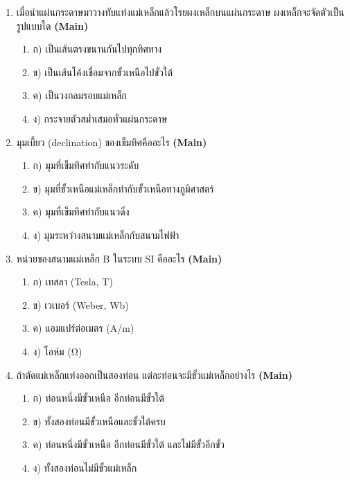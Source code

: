 \documentclass[12pt]{article}
\begin{document}
\begin{enumerate}[label=\arabic*.]
\begin{enumerate}[label=)]
\item ก) ความต้านทานของขดลวด
\item ข) จำนวนรอบของขดลวดและกระแสไฟฟ้า
\item ค) แรงดันไฟฟ้าของแหล่งจ่าย
\item ง) ความยาวของขดลวดเท่านั้น
\end{enumerate}
\item เมื่อนำแผ่นกระดาษมาวางทับแท่งแม่เหล็กแล้วโรยผงเหล็กบนแผ่นกระดาษ ผงเหล็กจะจัดตัวเป็นรูปแบบใด \hfill \textbf{\small (Main)}
\begin{enumerate}[label=)]
\item ก) เป็นเส้นตรงขนานกันไปทุกทิศทาง
\item ข) เป็นเส้นโค้งเชื่อมจากขั้วเหนือไปขั้วใต้
\item ค) เป็นวงกลมรอบแม่เหล็ก
\item ง) กระจายตัวสม่ำเสมอทั่วแผ่นกระดาษ
\end{enumerate}
\item มุมเบี้ยว (declination) ของเข็มทิศคืออะไร \hfill \textbf{\small (Main)}
\begin{enumerate}[label=)]
\item ก) มุมที่เข็มทิศทำกับแนวระดับ
\item ข) มุมที่ขั้วเหนือแม่เหล็กทำกับขั้วเหนือทางภูมิศาสตร์
\item ค) มุมที่เข็มทิศทำกับแนวดิ่ง
\item ง) มุมระหว่างสนามแม่เหล็กกับสนามไฟฟ้า
\end{enumerate}
\item หน่วยของสนามแม่เหล็ก B ในระบบ SI คืออะไร \hfill \textbf{\small (Main)}
\begin{enumerate}[label=)]
\item ก) เทสลา (Tesla, T)
\item ข) เวเบอร์ (Weber, Wb)
\item ค) แอมแปร์ต่อเมตร (A/m)
\item ง) โอห์ม (Ω)
\end{enumerate}
\item ถ้าตัดแม่เหล็กแท่งออกเป็นสองท่อน แต่ละท่อนจะมีขั้วแม่เหล็กอย่างไร \hfill \textbf{\small (Main)}
\begin{enumerate}[label=)]
\item ก) ท่อนหนึ่งมีขั้วเหนือ อีกท่อนมีขั้วใต้
\item ข) ทั้งสองท่อนมีขั้วเหนือและขั้วใต้ครบ
\item ค) ท่อนหนึ่งมีขั้วเหนือ อีกท่อนมีขั้วใต้ และไม่มีขั้วอีกขั้ว
\item ง) ทั้งสองท่อนไม่มีขั้วแม่เหล็ก

\end{enumerate}
\end{enumerate}
\end{document}
